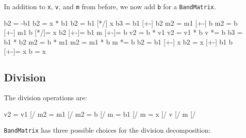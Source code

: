 \documentclass[twoside,letterpaper,11pt]{article}
\renewcommand{\tt}[1]{{\lstinline {#1}}}
\begin{document}
In addition to \tt{x}, \tt{v}, and \tt{m} from before, we now add \tt{b} 
for a \tt{BandMatrix}.

\begin{tmvcode}
b2 = -b1
b2 = x * b1
b2 = b1 [*/] x
b3 = b1 [+-] b2
m2 = m1 [+-] b
m2 = b [+-] m1
b [*/]= x
b2 [+-]= b1
m [+-]= b
v2 = b * v1
v2 = v1 * b
v *= b
b3 = b1 * b2
m2 = b * m1
m2 = m1 * b
m *= b
b2 = b1 [+-] x
b2 = x [+-] b1
b [+-]= x
b = x
\end{tmvcode}

\subsection{Division}
\label{BandMatrix_Division}

The division operations are:
\begin{tmvcode}
v2 = v1 [/%
m2 = m1 [/%
m2 = b [/%
m = b1 [/%
m = x [/%
v [/%
m [/%
\end{tmvcode}
\tt{BandMatrix} has three possible choices for the division decomposition:
\end{document}

